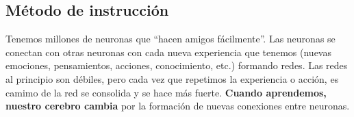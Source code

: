 \documentclass[
  letterpaper,
  DIV=11,
  numbers=noendperiod]{scrartcl}
\begin{document}
\subsection{Método de instrucción}\label{muxe9todo-de-instrucciuxf3n}

\begin{tcolorbox}[enhanced jigsaw, left=2mm, colframe=quarto-callout-tip-color-frame, toprule=.15mm, rightrule=.15mm, toptitle=1mm, bottomtitle=1mm, breakable, opacityback=0, title=\textcolor{quarto-callout-tip-color}{\faLightbulb}\hspace{0.5em}{¿Te has preguntado alguna vez qué pasa en tu cerebro cuando aprendes?
{[}@lang2016{]}}, bottomrule=.15mm, coltitle=black, colback=white, titlerule=0mm, arc=.35mm, leftrule=.75mm, opacitybacktitle=0.6, colbacktitle=quarto-callout-tip-color!10!white]

Tenemos millones de neuronas que ``hacen amigos fácilmente''. Las
neuronas se conectan con otras neuronas con cada nueva experiencia que
tenemos (nuevas emociones, pensamientos, acciones, conocimiento, etc.)
formando redes. Las redes al principio son débiles, pero cada vez que
repetimos la experiencia o acción, es camimo de la red se consolida y se
hace más fuerte. \textbf{Cuando aprendemos, nuestro cerebro cambia} por
la formación de nuevas conexiones entre neuronas.

\end{tcolorbox}
\end{document}
